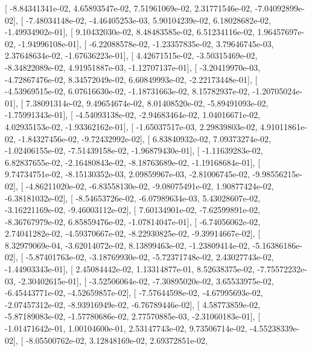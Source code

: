 \documentclass{article}
\begin{document}
       [ -8.84341341e-02,   4.65893547e-02,   7.51961069e-02,
          2.31771546e-02,  -7.04092899e-02],
       [ -7.48034148e-02,  -4.46405253e-03,   5.90104239e-02,
          6.18028682e-02,  -1.49934902e-01],
       [  9.10432030e-02,   8.48483585e-02,   6.51234116e-02,
          1.96457697e-02,  -1.94996108e-01],
       [ -6.22088578e-02,  -1.23357835e-02,   3.79646745e-03,
          2.37648634e-02,  -1.67636223e-01],
       [  4.42671515e-02,  -3.50315469e-02,  -8.34822089e-02,
          4.91951887e-03,  -1.12707137e-01],
       [ -3.20419970e-03,  -4.72867476e-02,   8.34572049e-02,
          6.60849993e-02,  -2.22173448e-01],
       [ -4.53969515e-02,   6.07616630e-02,  -1.18731663e-02,
          8.15782937e-02,  -1.20705024e-01],
       [  7.38091314e-02,   9.49654674e-02,   8.01408520e-02,
         -5.89491093e-02,  -1.75991343e-01],
       [ -4.54093138e-02,  -2.94683464e-02,   1.04016671e-02,
          4.02935153e-02,  -1.93362162e-01],
       [ -1.65037517e-03,   2.29839803e-02,   4.91011861e-02,
         -1.84327456e-02,  -9.72432992e-02],
       [  6.83840932e-02,   7.09373274e-02,  -1.02406155e-02,
         -7.51439158e-02,  -1.96879430e-01],
       [ -1.11639283e-02,   6.82837655e-02,  -2.16480843e-02,
         -8.18763689e-02,  -1.19168684e-01],
       [  9.74734751e-02,  -8.15130352e-03,   2.09859967e-03,
         -2.81006745e-02,  -9.98556215e-02],
       [ -4.86211020e-02,  -6.83558130e-02,  -9.08075491e-02,
          1.90877424e-02,  -6.38181032e-02],
       [ -8.54653726e-02,  -6.07989634e-03,   5.43028607e-02,
         -3.16221169e-02,  -9.46003112e-02],
       [  7.60134901e-02,  -7.62599891e-02,  -8.36767979e-02,
          6.85859476e-02,  -1.07814047e-01],
       [ -6.74056062e-02,   2.74041282e-02,  -4.59370667e-02,
         -8.22930825e-02,  -9.39914667e-02],
       [  8.32979069e-04,  -3.62014072e-02,   8.13899463e-02,
         -1.23809414e-02,  -5.16386186e-02],
       [ -5.87401763e-02,  -3.18769930e-02,  -5.72371748e-02,
          2.43027743e-02,  -1.44903343e-01],
       [  2.45084442e-02,   1.13314877e-01,   8.52638375e-02,
         -7.75572232e-03,  -2.30402615e-01],
       [ -3.52506064e-02,  -7.30895020e-02,   3.65533975e-02,
         -6.45443771e-02,  -4.52659857e-02],
       [ -7.57644598e-02,  -4.67995693e-02,  -2.07457312e-02,
         -8.93916949e-02,  -6.76789446e-02],
       [  4.58773859e-02,  -5.87189083e-02,  -1.57780686e-02,
          2.77570885e-03,  -2.31060183e-01],
       [ -1.01471642e-01,   1.00104600e-01,   2.53147743e-02,
          9.73506714e-02,  -4.55238339e-02],
       [ -8.05500762e-02,   3.12848169e-02,   2.69372851e-02,
\end{document}

